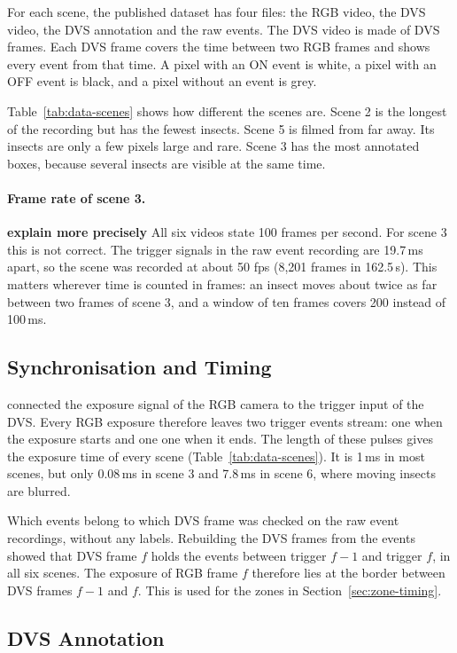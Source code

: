 For each scene, the published dataset has four files: the RGB video, the DVS
video, the DVS annotation and the raw events. The DVS video is made of DVS
frames. Each DVS frame covers the time between two RGB frames and shows every
event from that time. A pixel with an ON event is white, a pixel with an OFF
event is black, and a pixel without an event is grey.

Table~\ref{tab:data-scenes} shows how different the scenes are. Scene 2 is the longest of
the recording but has the fewest insects. Scene 5 is filmed from far away. Its insects are
only a few pixels large and rare. Scene 3 has the most annotated boxes, because several
insects are visible at the same time.

\paragraph{Frame rate of scene 3.} \textbf{explain more precisely} All six videos state 100 
frames per second. For scene 3 this is not correct. The trigger signals in the raw event
recording are 19.7\,ms apart, so the scene was recorded at about 50 fps (8,201 frames 
in 162.5\,s). This matters wherever time is counted in frames: an insect moves about twice
as far between two frames of scene 3, and a window of ten frames covers 200 instead 
of 100\,ms.

\subsection{Synchronisation and Timing}
\label{sec:data-timing}

\textcite{gebauer_towards_2024} connected the exposure signal of the RGB camera to the 
trigger input of the DVS. Every RGB exposure therefore leaves two trigger events stream: 
one when the exposure starts and one one when it ends. The length of these pulses gives the
exposure time of every scene (Table~\ref{tab:data-scenes}). It is 1\,ms in most scenes,
but only 0.08\,ms in scene 3 and 7.8\,ms in scene 6, where moving insects are blurred.

Which events belong to which DVS frame was checked on the raw event recordings,
without any labels. Rebuilding the DVS frames from the events showed that DVS frame
$f$ holds the events between trigger $f-1$ and trigger $f$, in all six scenes. The
exposure of RGB frame $f$ therefore lies at the border between DVS frames $f-1$
and $f$. This is used for the zones in Section~\ref{sec:zone-timing}.

\subsection{DVS Annotation}
\label{sec:data-dvs-annotation}

